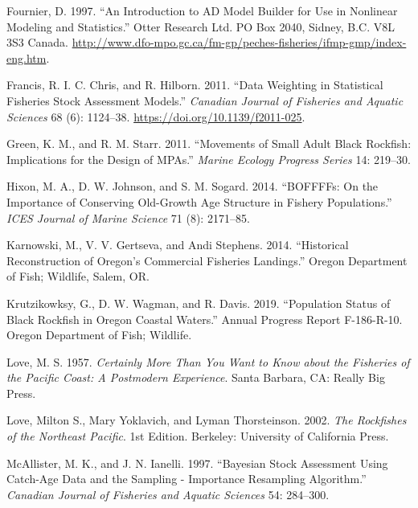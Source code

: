 \documentclass[11pt,
  english,
  letterpaper,
]{article}
\newlength{\cslhangindent}
\newenvironment{CSLReferences}[2] %
 {%
  \setlength{\parindent}{0pt}
  \ifodd #1 \everypar{\setlength{\hangindent}{\cslhangindent}}\ignorespaces\fi
  \ifnum #2 > 0
  \setlength{\parskip}{#2\baselineskip}
  \fi
 }%
 {}
\begin{document}
\begin{CSLReferences}{1}{0}
\leavevmode{}%
Fournier, D. 1997. {``An Introduction to AD Model Builder for Use in Nonlinear Modeling and Statistics.''} Otter Research Ltd. PO Box 2040, Sidney, B.C. V8L 3S3 Canada. \url{http://www.dfo-mpo.gc.ca/fm-gp/peches-fisheries/ifmp-gmp/index-eng.htm}.

\leavevmode{}%
Francis, R. I. C. Chris, and R. Hilborn. 2011. {``Data Weighting in Statistical Fisheries Stock Assessment Models.''} \emph{Canadian Journal of Fisheries and Aquatic Sciences} 68 (6): 1124--38. \url{https://doi.org/10.1139/f2011-025}.

\leavevmode{}%
Green, K. M., and R. M. Starr. 2011. {``Movements of Small Adult Black Rockfish: Implications for the Design of MPAs.''} \emph{Marine Ecology Progress Series} 14: 219--30.

\leavevmode{}%
Hixon, M. A., D. W. Johnson, and S. M. Sogard. 2014. {``BOFFFFs: On the Importance of Conserving Old-Growth Age Structure in Fishery Populations.''} \emph{ICES Journal of Marine Science} 71 (8): 2171--85.

\leavevmode{}%
Karnowski, M., V. V. Gertseva, and Andi Stephens. 2014. {``Historical {Reconstruction} of {Oregon}'s {Commercial} {Fisheries} {Landings}.''} Oregon Department of Fish; Wildlife, Salem, OR.

\leavevmode{}%
Krutzikowksy, G., D. W. Wagman, and R. Davis. 2019. {``Population Status of Black Rockfish in Oregon Coastal Waters.''} Annual Progress Report F-186-R-10. Oregon Department of Fish; Wildlife.

\leavevmode{}%
Love, M. S. 1957. \emph{Certainly More Than You Want to Know about the Fisheries of the Pacific Coast: A Postmodern Experience}. Santa Barbara, CA: Really Big Press.

\leavevmode{}%
Love, Milton S., Mary Yoklavich, and Lyman Thorsteinson. 2002. \emph{The Rockfishes of the Northeast Pacific}. 1st Edition. Berkeley: University of California Press.

\leavevmode{}%
McAllister, M. K., and J. N. Ianelli. 1997. {``Bayesian Stock Assessment Using Catch-Age Data and the Sampling - Importance Resampling Algorithm.''} \emph{Canadian Journal of Fisheries and Aquatic Sciences} 54: 284--300.


\end{CSLReferences}
\end{document}
